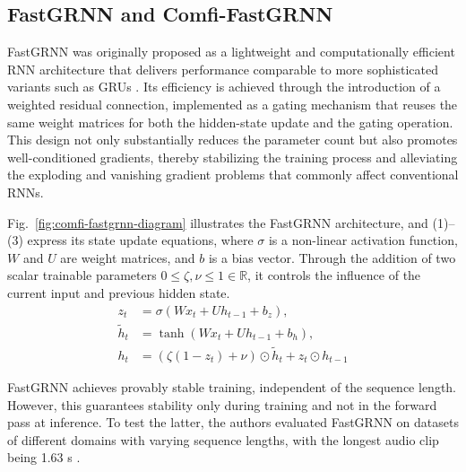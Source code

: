 \documentclass[9pt]{article}
\begin{document}
\subsection{FastGRNN and Comfi-FastGRNN}
\label{ssec:comfi-fastgrnn}

FastGRNN was originally proposed as a lightweight and computationally efficient RNN architecture that delivers performance comparable to more sophisticated variants such as GRUs \cite{C8}. Its efficiency is achieved through the introduction of a weighted residual connection, implemented as a gating mechanism that reuses the same weight matrices for both the hidden-state update and the gating operation. This design not only substantially reduces the parameter count but also promotes well-conditioned gradients, thereby stabilizing the training process and alleviating the exploding and vanishing gradient problems that commonly affect conventional RNNs.

Fig.~\ref{fig:comfi-fastgrnn-diagram} illustrates the FastGRNN architecture, and (1)--(3) express its state update equations, where $\sigma$ is a non-linear activation function, $W$ and $U$ are weight matrices, and $b$ is a bias vector. Through the addition of two scalar trainable parameters $0\leq\zeta,\nu\leq1\in\mathbb{R}$, it controls the influence of the current input and previous hidden state.
 \begin{align}
z_t &= \sigma(W x_t + U h_{t-1} + b_z), \\
\tilde{h}_t &= \tanh(W x_t + U h_{t-1} + b_h), \\
h_t &= \left(\zeta (1 - z_t) + \nu \right) \odot \tilde{h}_t + z_t \odot h_{t-1}
\end{align}


 
FastGRNN achieves provably stable training, independent of the sequence length. However, this guarantees stability only during training and not in the forward pass at inference. To test the latter, the authors evaluated FastGRNN on datasets of different domains with varying sequence lengths, with the longest audio clip being 1.63 s \cite{C8}.
\end{document}

